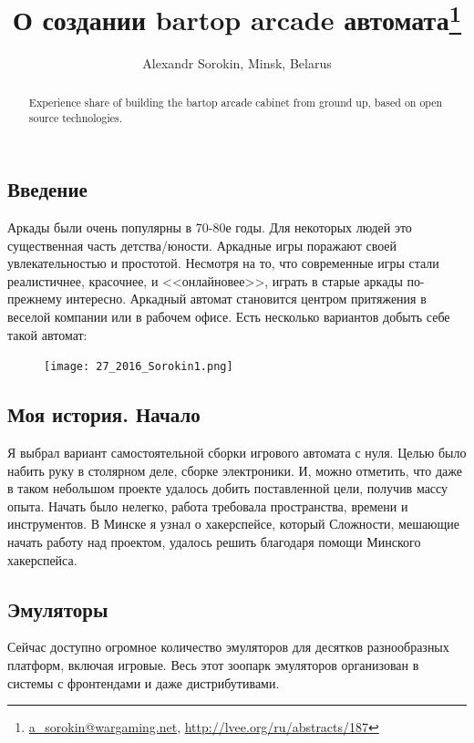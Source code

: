 \documentclass[10pt, a5paper]{article}
\begin{document}
\title{О создании bartop arcade автомата\footnote{\url{a_sorokin@wargaming.net}, \url{http://lvee.org/ru/abstracts/187}}}
\author{Alexandr Sorokin, Minsk, Belarus}
\maketitle
\begin{abstract}
Experience share of building the bartop arcade cabinet from ground up, based on open source technologies.
\end{abstract}
\subsection*{Введение}

Аркады были очень популярны в 70-80е годы. Для некоторых людей это существенная часть детства/юности. Аркадные игры поражают своей увлекательностью и простотой. Несмотря на то, что современные игры стали реалистичнее, красочнее, и <<онлайновее>>, играть в старые аркады по-прежнему интересно. Аркадный автомат становится центром притяжения в веселой компании или в рабочем офисе. Есть несколько вариантов добыть себе такой автомат:

\begin{figure}[h!]
  \centering
  \texttt{[image: 27\_2016\_Sorokin1.png]}
\end{figure}


\subsection*{Моя история. Начало}

Я выбрал вариант самостоятельной сборки игрового автомата с  нуля. Целью было набить руку в столярном деле, сборке электроники. И, можно отметить, что даже в таком небольшом проекте удалось добить поставленной цели, получив массу опыта.
Начать было нелегко, работа требовала пространства, времени и инструментов. В Минске я узнал о хакерспейсе, который Сложности, мешающие начать работу над проектом, удалось решить благодаря помощи Минского хакерспейса.

\subsection*{Эмуляторы}

Сейчас доступно огромное количество эмуляторов для десятков разнообразных платформ, включая игровые. Весь этот зоопарк эмуляторов организован в системы с фронтендами и даже дистрибутивами.
\end{document}
